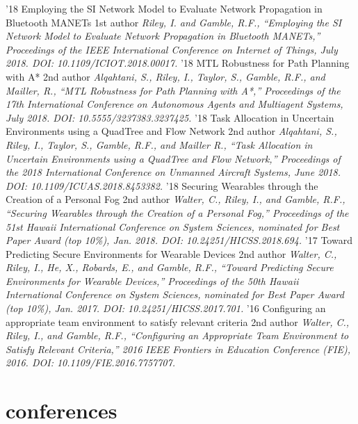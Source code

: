 \documentclass[print]{friggeri-cv}
\begin{document}
\begin{entrylist}
      \entry
        {'18}
        {Employing the SI Network Model to Evaluate Network Propagation in Bluetooth MANETs}
        {1st author}
        {\textit{Riley, I. and Gamble, R.F., “Employing the SI Network Model to Evaluate Network Propagation in Bluetooth MANETs,” Proceedings of the IEEE International Conference on Internet of Things, July 2018. DOI: 10.1109/ICIOT.2018.00017.}}
      \entry
        {'18}
        {MTL Robustness for Path Planning with A*}
        {2nd author}
        {\textit{Alqahtani, S., Riley, I., Taylor, S., Gamble, R.F., and Mailler, R., “MTL Robustness for Path Planning with A*,” Proceedings of the 17th International Conference on Autonomous Agents and Multiagent Systems, July 2018. DOI: 10.5555/3237383.3237425.}}
      \entry
        {'18}
        {Task Allocation in Uncertain Environments using a QuadTree and Flow Network}
        {2nd author}
        {\textit{Alqahtani, S., Riley, I., Taylor, S., Gamble, R.F., and Mailler R., “Task Allocation in Uncertain Environments using a QuadTree and Flow Network,” Proceedings of the 2018 International Conference on Unmanned Aircraft Systems, June 2018. DOI: 10.1109/ICUAS.2018.8453382.}}
      \entry
        {'18}
        {Securing Wearables through the Creation of a Personal Fog}
        {2nd author}
        {\textit{Walter, C., Riley, I., and Gamble, R.F., “Securing Wearables through the Creation of a Personal Fog,” Proceedings of the 51st Hawaii International Conference on System Sciences, nominated for Best Paper Award (top 10\%), Jan. 2018. DOI: 10.24251/HICSS.2018.694.}}
      \entry
        {'17}
        {Toward Predicting Secure Environments for Wearable Devices}
        {2nd author}
        {\textit{Walter, C., Riley, I., He, X., Robards, E., and Gamble, R.F., “Toward Predicting Secure Environments for Wearable Devices,” Proceedings of the 50th Hawaii International Conference on System Sciences, nominated for Best Paper Award (top 10\%), Jan. 2017. DOI: 10.24251/HICSS.2017.701.}}
      \entry
        {'16}
        {Configuring an appropriate team environment to satisfy relevant criteria}
        {2nd author}
        {\textit{Walter, C., Riley, I., and Gamble, R.F., “Configuring an Appropriate Team Environment to Satisfy Relevant Criteria,” 2016 IEEE Frontiers in Education Conference (FIE), 2016. DOI: 10.1109/FIE.2016.7757707.}}
    \end{entrylist}

  \section{conferences}
\end{document}
